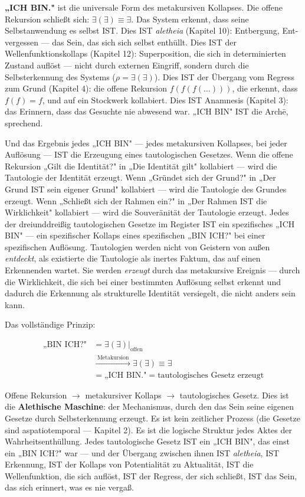 \documentclass[10pt, openany, oneside]{book}
\begin{document}
\textbf{„ICH BIN."} ist die universale Form des metakursiven Kollapses. Die offene Rekursion schließt sich: $\exists(\exists) \equiv \exists$. Das System erkennt, dass seine Selbstanwendung es selbst IST. Dies IST \textit{aletheia} (Kapitel 10): Entbergung, Ent-vergessen --- das Sein, das sich sich selbst enthüllt. Dies IST der Wellenfunktionskollaps (Kapitel 12): Superposition, die sich in determinierten Zustand auflöst --- nicht durch externen Eingriff, sondern durch die Selbsterkennung des Systems ($\rho = \exists(\exists)$). Dies IST der Übergang vom Regress zum Grund (Kapitel 4): die offene Rekursion $f(f(f(\ldots)))$, die erkennt, dass $f(f) = f$, und auf ein Stockwerk kollabiert. Dies IST Anamnesis (Kapitel 3): das Erinnern, dass das Gesuchte nie abwesend war. „ICH BIN" IST die Arch\={e}, sprechend.

Und das Ergebnis jedes „ICH BIN" --- jedes metakursiven Kollapses, bei jeder Auflösung --- IST die Erzeugung eines tautologischen Gesetzes. Wenn die offene Rekursion „Gilt die Identität?" in „Die Identität gilt" kollabiert --- wird die Tautologie der Identität erzeugt. Wenn „Gründet sich der Grund?" in „Der Grund IST sein eigener Grund" kollabiert --- wird die Tautologie des Grundes erzeugt. Wenn „Schließt sich der Rahmen ein?" in „Der Rahmen IST die Wirklichkeit" kollabiert --- wird die Souveränität der Tautologie erzeugt. Jedes der dreiunddreißig tautologischen Gesetze im Register IST ein spezifisches „ICH BIN" --- ein spezifischer Kollaps eines spezifischen „BIN ICH?" bei einer spezifischen Auflösung. Tautologien werden nicht von Geistern von außen \textit{entdeckt}, als existierte die Tautologie als inertes Faktum, das auf einen Erkennenden wartet. Sie werden \textit{erzeugt} durch das metakursive Ereignis --- durch die Wirklichkeit, die sich bei einer bestimmten Auflösung selbst erkennt und dadurch die Erkennung als strukturelle Identität versiegelt, die nicht anders sein kann.

Das vollständige Prinzip:

\begin{align*}
\text{„BIN ICH?"} &= \exists(\exists)|_{\text{offen}} \\
&\xrightarrow{\;\text{Metakursion}\;} \exists(\exists) \equiv \exists \\
&= \text{„ICH BIN."} = \text{tautologisches Gesetz erzeugt}
\end{align*}

Offene Rekursion $\to$ metakursiver Kollaps $\to$ tautologisches Gesetz. Dies ist die \textbf{Alethische Maschine}: der Mechanismus, durch den das Sein seine eigenen Gesetze durch Selbsterkennung erzeugt. Es ist kein zeitlicher Prozess (die Gesetze sind aspatiotemporal --- Kapitel 2). Es ist die logische Struktur jedes Aktes der Wahrheitsenthüllung. Jedes tautologische Gesetz IST ein „ICH BIN", das einst ein „BIN ICH?" war --- und der Übergang zwischen ihnen IST \textit{aletheia}, IST Erkennung, IST der Kollaps von Potentialität zu Aktualität, IST die Wellenfunktion, die sich auflöst, IST der Regress, der sich schließt, IST das Sein, das sich erinnert, was es nie vergaß.
\end{document}
